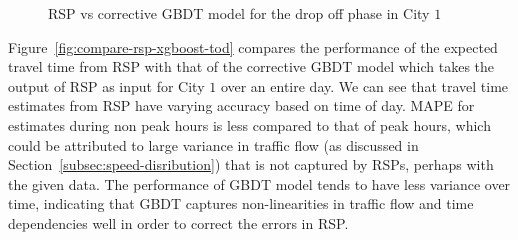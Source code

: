 \begin{figure}[!tb]
	\centering
	\vfill%
	\label{fig:eval-dropoff-sg}
	\caption{\ac{RSP} vs corrective GBDT model for the drop off phase in City $1$}
\end{figure} 

Figure~\ref{fig:compare-rsp-xgboost-tod} compares the performance of the expected travel time from \ac{RSP}  with that of the corrective GBDT model which takes the output of \ac{RSP} as input for City $1$ over an entire day. We can see that travel time estimates from \ac{RSP} have varying accuracy based on time of day. MAPE for estimates during non peak hours is less compared to that of peak hours, which could be attributed to large variance in traffic flow (as discussed in Section~\ref{subsec:speed-disribution}) that is not captured by RSPs, perhaps with the given data. The performance of  GBDT model tends to have less variance over time, indicating that GBDT captures non-linearities in traffic flow and time dependencies well in order to correct the errors in \ac{RSP}. 


